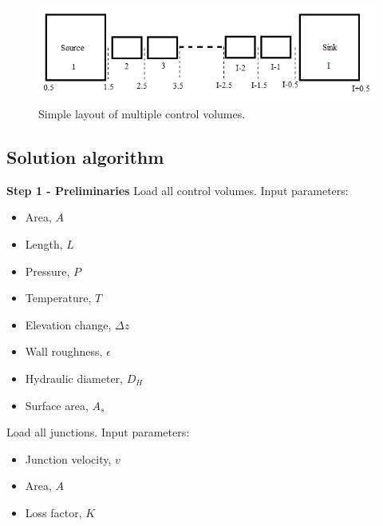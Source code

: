 \documentclass[11pt,letterpaper,titlepage]{article}
\begin{document}
	\begin{center}
		\begin{minipage}[c]{0.85\textwidth}
	
			\begin{figure}[H]
			
				\includegraphics[width=6in]{ZZZ_SimpleSystem.png}
				\caption{Simple layout of multiple control volumes.}
				\label{figure:ZZZ_SimpleSystem}
			\end{figure}
		\end{minipage}
	\end{center}
\vspace{0.5cm}










\newpage
\subsection{Solution algorithm}

\textbf{Step 1 - Preliminaries}\newline
Load all control volumes. Input parameters:
\begin{itemize}
\item Area, $A$
\item Length, $L$
\item Pressure, $P$
\item Temperature, $T$
\item Elevation change, $\Delta z$
\item Wall roughness, $\epsilon$
\item Hydraulic diameter, $D_H$
\item Surface area, $A_s$
\end{itemize}

\vspace{0.5cm}
\noindent
Load all junctions. Input parameters:
\begin{itemize}
\item Junction velocity, $v$
\item Area, $A$
\item Loss factor, $K$
\end{itemize}
\end{document}
